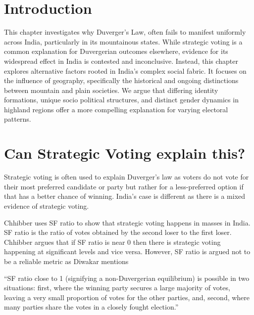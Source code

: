 \section{Introduction}

This chapter investigates why Duverger’s Law, often fails to manifest uniformly across India, particularly in its mountainous states. While strategic voting is a common explanation for Duvergerian outcomes elsewhere, evidence for its widespread effect in India is contested and inconclusive. Instead, this chapter explores alternative factors rooted in India’s complex social fabric. It focuses on the  influence of geography, specifically the historical and ongoing distinctions between mountain and plain societies. We argue that differing identity formations, unique socio political structures, and distinct gender dynamics in highland regions offer a more compelling explanation for varying electoral patterns.


\section{Can Strategic Voting explain this?}

Strategic voting is often used to explain Duverger’s law as voters do not vote for their most preferred candidate or party but rather for a less-preferred option if that has a better chance of winning. India’s case is different as there is a mixed evidence of strategic voting. 

\vspace{0.3cm}

Chhibber uses SF ratio to show that strategic voting happens in masses in India. SF ratio is the ratio of votes obtained by the second loser to the first loser. Chhibber argues that if SF ratio is near 0 then there is strategic voting happening at significant levels and vice versa. However, SF ratio is argued not to be a reliable metric as Diwakar mentions 

\vspace{0.3cm}

“SF ratio close to 1 (signifying a non-Duvergerian equilibrium) is possible in two situations: first, where the winning party secures a large majority of votes, leaving a very small proportion of votes for the other parties, and, second, where many parties share the votes in a closely fought election.”

\vspace{0.3cm}

